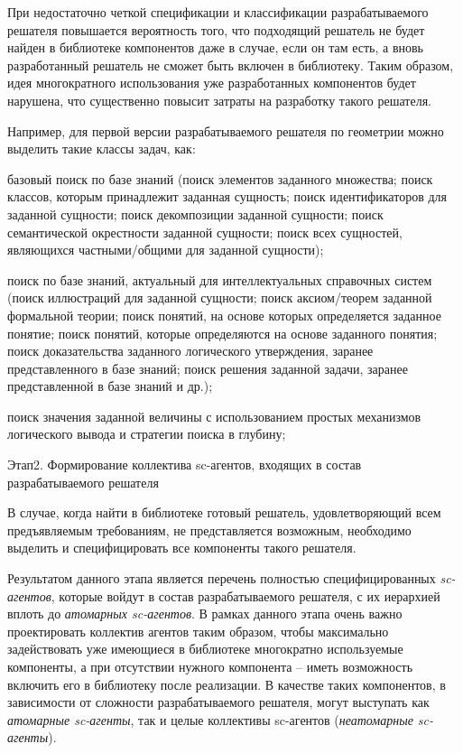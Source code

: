 \begin{SCn}
{\begin{scnitemize}
При недостаточно четкой спецификации и классификации разрабатываемого решателя повышается вероятность того, что подходящий решатель не будет найден в библиотеке компонентов даже в случае, если он там есть, а вновь разработанный решатель не сможет быть включен в библиотеку. Таким образом, идея многократного использования уже разработанных компонентов будет нарушена, что существенно повысит затраты на разработку такого решателя. 

Например, для первой версии разрабатываемого решателя по геометрии можно выделить такие классы задач, как:

\begin{scnenumerate}
 \item базовый поиск по базе знаний (поиск элементов заданного множества; поиск классов, которым принадлежит заданная сущность; поиск идентификаторов для заданной сущности; поиск декомпозиции заданной сущности; поиск семантической окрестности заданной сущности; поиск всех сущностей, являющихся частными/общими для заданной сущности);
 \item поиск по базе знаний, актуальный для интеллектуальных справочных систем (поиск иллюстраций для заданной сущности; поиск аксиом/теорем заданной формальной теории; поиск понятий, на основе которых определяется заданное понятие; поиск понятий, которые определяются на основе заданного понятия; поиск доказательства заданного логического утверждения, заранее представленного в базе знаний; поиск решения заданной задачи, заранее представленной в базе знаний и др.);
 \item поиск значения заданной величины с использованием простых механизмов логического вывода и стратегии поиска в глубину;
\end{scnenumerate}

\item Этап2. Формирование коллектива sc-агентов, входящих в состав разрабатываемого решателя

В случае, когда найти в библиотеке готовый решатель, удовлетворяющий всем предъявляемым требованиям, не представляется возможным, необходимо выделить и специфицировать все компоненты такого решателя.

Результатом данного этапа является перечень полностью специфицированных \textit{sc-агентов}, которые войдут в состав разрабатываемого решателя, с их иерархией вплоть до \textit{атомарных sc-агентов}. В рамках данного этапа очень важно проектировать коллектив агентов таким образом, чтобы максимально задействовать уже имеющиеся в библиотеке многократно используемые компоненты, а при отсутствии нужного компонента – иметь возможность включить его в библиотеку после реализации. В качестве таких компонентов, в зависимости от сложности разрабатываемого решателя, могут выступать как \textit{атомарные sc-агенты}, так и целые коллективы sc-агентов (\textit{неатомарные \mbox{sc-агенты}}).


\end{scnitemize}}
\end{SCn}
